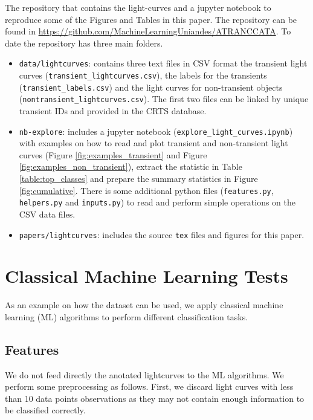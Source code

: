\documentclass[a4paper,fleqn,usenatbib]{mnras}
\begin{document}
The repository that contains the light-curves and a jupyter notebook
to reproduce some of the Figures and Tables in this paper.
The repository can be found in \url{https://github.com/MachineLearningUniandes/ATRANCCATA}. 
To date the repository has three main folders.
\begin{itemize}

\item \texttt{data/lightcurves}: 
contains three text files in CSV format
the transient light curves (\texttt{transient\_lightcurves.csv}),
the labels for the transients (\texttt{transient\_labels.csv}) and
the light curves for non-transient objects
(\texttt{nontransient\_lightcurves.csv}). 
The first two files can be linked by unique transient IDs and
provided in the CRTS database. 
\item \texttt{nb-explore}: includes a jupyter notebook
  (\texttt{explore\_light\_curves.ipynb}) with examples on how to read
  and plot transient and non-transient light curves (Figure
  \ref{fig:examples_transient} and Figure
  \ref{fig:examples_non_transient}), extract the statistic in Table
  \ref{table:top_classes} and prepare the summary statistics in Figure
  \ref{fig:cumulative}. 
  There is some additional python files (\texttt{features.py},
  \texttt{helpers.py} and \texttt{inputs.py}) to read and perform
  simple operations on the CSV data files. 
\item \texttt{papers/lightcurves}: includes the source \texttt{tex} files and
  figures for this paper. 
\end{itemize}



\section{Classical Machine Learning Tests} 
\label{sec:ml_tests}

As an example on how the dataset can be used, we apply classical
machine learning (ML) algorithms to perform different classification tasks.


\subsection{Features}

We do not feed directly the anotated lightcurves to the ML algorithms.
We perform some preprocessing as follows.
First, we discard light curves with less than 10 data points
observations as they may not contain enough information to be
classified correctly.
\end{document}
